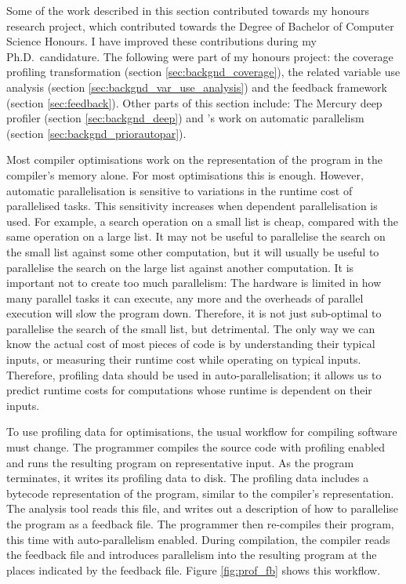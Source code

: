 

Some of the work described in this section contributed towards my honours
research project,
which contributed towards 
the Degree of Bachelor of Computer Science Honours.
I have improved these contributions during my Ph.D.\
candidature.
The following were part of my honours project:
the coverage profiling transformation (section \ref{sec:backgnd_coverage}),
the related variable use analysis (section \ref{sec:backgnd_var_use_analysis})
and the feedback framework (section \ref{sec:feedback}).
Other parts of this section include:
The Mercury deep profiler \citep{conway:2001:mercury-deep} (section
\ref{sec:backgnd_deep}) and
\citet*{tannier:2007:parallel_mercury}'s work on automatic parallelism
(section \ref{sec:backgnd_priorautopar}).

Most compiler optimisations work on the representation of the program in
the compiler's memory alone.
For most optimisations this is enough.
However,
automatic parallelisation is sensitive to variations in the runtime cost of
parallelised tasks.
This sensitivity increases when dependent parallelisation is used.
For example,
a search operation on a small list is cheap, compared with the same operation on
a large list.
It may not be useful to parallelise the search on the small list against some
other computation,
but it will usually be useful to parallelise the search on the large list
against another computation.
It is important not to create too much parallelism:
The hardware is limited in how many parallel tasks it can execute,
any more and the overheads of parallel execution will slow the program down.
Therefore, it is not just sub-optimal to parallelise the search of the small list,
but detrimental.
The only way we can know the actual cost of most pieces of code
is by understanding their typical inputs,
or measuring their runtime cost while operating on typical inputs.
Therefore,
profiling data should be used in auto-parallelisation;
it allows us to predict runtime costs for computations whose
runtime is dependent on their inputs.

To use profiling data for optimisations,
the usual workflow for compiling software must change.
The programmer compiles the source code with profiling enabled and runs the
resulting program on representative input.
As the program terminates,
it writes its profiling data to disk.
The profiling data includes a bytecode representation of the program,
similar to the compiler's representation.
The analysis tool reads this file,
and writes out a description of how to parallelise the program as a feedback
file.
The programmer then re-compiles their program,
this time with auto-parallelism enabled.
During compilation,
the compiler reads the feedback file and introduces parallelism into the
resulting program at the places indicated by the feedback file.
Figure \ref{fig:prof_fb} shows this workflow.

